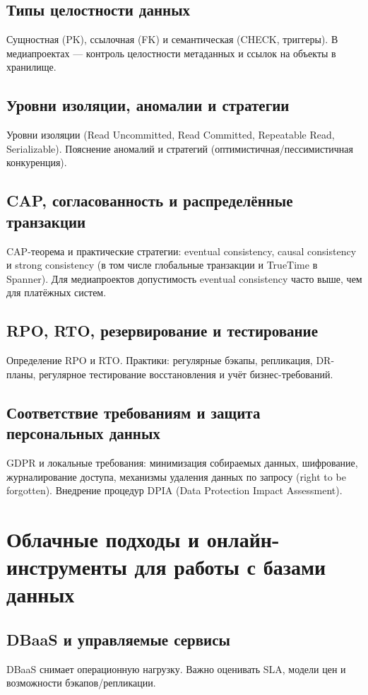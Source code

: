 \documentclass[14pt,a4paper]{extarticle}
\begin{document}
\subsection{Типы целостности данных}
Сущностная (PK), ссылочная (FK) и семантическая (CHECK, триггеры). В медиапроектах — контроль целостности метаданных и ссылок на объекты в хранилище.

\subsection{Уровни изоляции, аномалии и стратегии}
Уровни изоляции (Read Uncommitted, Read Committed, Repeatable Read, Serializable). Пояснение аномалий и стратегий (оптимистичная/пессимистичная конкуренция).

\subsection{CAP, согласованность и распределённые транзакции}
CAP-теорема и практические стратегии: eventual consistency, causal consistency и strong consistency (в том числе глобальные транзакции и TrueTime в Spanner). Для медиапроектов допустимость eventual consistency часто выше, чем для платёжных систем.

\subsection{RPO, RTO, резервирование и тестирование}
Определение RPO и RTO. Практики: регулярные бэкапы, репликация, DR-планы, регулярное тестирование восстановления и учёт бизнес-требований.

\subsection{Соответствие требованиям и защита персональных данных}
GDPR и локальные требования: минимизация собираемых данных, шифрование, журналирование доступа, механизмы удаления данных по запросу (right to be forgotten). Внедрение процедур DPIA (Data Protection Impact Assessment).

\section{Облачные подходы и онлайн-инструменты для работы с базами данных}
\subsection{DBaaS и управляемые сервисы}
DBaaS снимает операционную нагрузку. Важно оценивать SLA, модели цен и возможности бэкапов/репликации.
\end{document}
